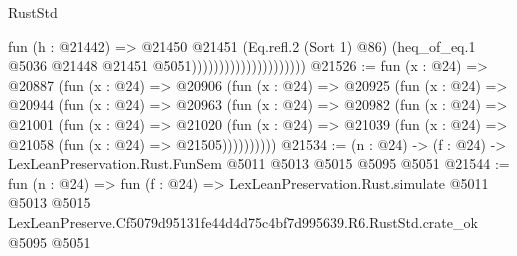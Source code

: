\begin{lexlean}{RustStd}
\begin{coremodule}
                                          fun (h : @21442) =>
                                          @21450
                                            @21451
                                            (Eq.refl.{2} (Sort 1) @86)
                                            (heq_of_eq.{1}
                                              @5036
                                              @21448
                                              @21451
                                              @5051)))))))))))))))))))))
@21526 := fun (x : @24) =>
  @20887
    (fun (x : @24) =>
    @20906
      (fun (x : @24) =>
      @20925
        (fun (x : @24) =>
        @20944
          (fun (x : @24) =>
          @20963
            (fun (x : @24) =>
            @20982
              (fun (x : @24) =>
              @21001
                (fun (x : @24) =>
                @21020
                  (fun (x : @24) =>
                  @21039 (fun (x : @24) => @21058 (fun (x : @24) => @21505))))))))))
@21534 := (n : @24) -> (f : @24) -> LexLeanPreservation.Rust.FunSem @5011 @5013 @5015 @5095 @5051
@21544 := fun (n : @24) =>
  fun (f : @24) =>
  LexLeanPreservation.Rust.simulate
    @5011
    @5013
    @5015
    LexLeanPreserve.Cf5079d95131fe44d4d75c4bf7d995639.R6.RustStd.crate_ok
    @5095
    @5051
\end{coremodule}
\end{lexlean}
